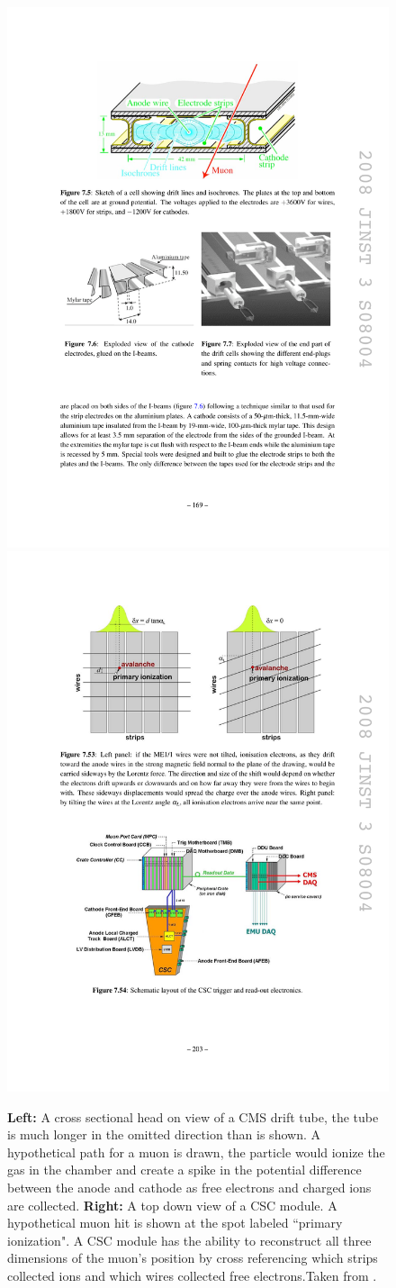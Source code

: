       \begin{figure}[h!]
        \centering
        \includegraphics[width=.45\textwidth]{figures/cms_drifttube.pdf}
        \includegraphics[width=.45\textwidth]{figures/cms_CSC.pdf}
        \caption[A cross sectional head on view of a CMS drift tube and a top down view of a CSC module.]{\textbf{Left:} A cross sectional head on view of a CMS drift tube, the tube is much longer in the omitted direction than is shown. A hypothetical path for a muon is drawn, the particle would ionize the gas in the chamber and create a spike in the potential difference between the anode and cathode as free electrons and charged ions are collected.
        \textbf{Right:} A top down view of a CSC module. A hypothetical muon hit is shown at the spot labeled ``primary ionization". A CSC module has the ability to reconstruct all three dimensions of the muon's position by cross referencing which strips collected ions and which wires collected free electrons.Taken from \cite{cms_jinst}.}
        \label{fig:muon_detectors}
      \end{figure}

